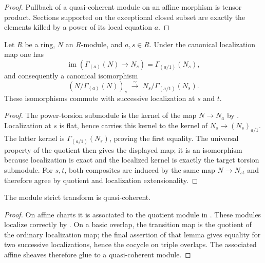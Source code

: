 \begin{proof}
  Pullback of a quasi-coherent module on an affine morphism is tensor product.
  Sections supported on the exceptional closed subset are exactly the elements
  killed by a power of its local equation $a$.
\end{proof}

\begin{lemma}
  \label{lemma:nagata-module-power-torsion-localization}

  Let $R$ be a ring, $N$ an $R$-module, and $a,s\in R$.  Under the canonical
  localization map one has
  \[
    \operatorname{im}\!\left(\Gamma_{(a)}(N)\to N_s\right)
      =\Gamma_{(a/1)}(N_s),
  \]
  and consequently a canonical isomorphism
  \[
    (N/\Gamma_{(a)}(N))_s
      \;\xrightarrow{\sim}\;
    N_s/\Gamma_{(a/1)}(N_s).
  \]
  These isomorphisms commute with successive localization at $s$ and $t$.
\end{lemma}

\begin{proof}
  The power-torsion submodule is the kernel of the map
  $N\to N_a$ by
  .  Localization at
  $s$ is flat, hence carries this kernel to the kernel of
  $N_s\to (N_s)_{a/1}$.  The latter kernel is
  $\Gamma_{(a/1)}(N_s)$, proving the first equality.  The universal property
  of the quotient then gives the displayed map; it is an isomorphism because
  localization is exact and the localized kernel is exactly the target
  torsion submodule.  For $s,t$, both composites are induced by the same map
  $N\to N_{st}$ and therefore agree by quotient and localization
  extensionality.
\end{proof}

\begin{lemma}
  \label{lemma:nagata-module-strict-transform-qc}

  The module strict transform is quasi-coherent.
\end{lemma}

\begin{proof}
  On affine charts it is associated to the quotient module in
  .  These modules localize
  correctly by
  .  On a basic overlap,
  the transition map is the quotient of the ordinary localization map; the
  final assertion of that lemma gives equality for two successive
  localizations, hence the cocycle on triple overlaps.  The associated affine
  sheaves therefore glue to a quasi-coherent module.
\end{proof}

